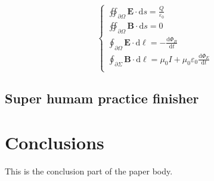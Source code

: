 \begin{equation}
    \left\{ \begin{array}{l}
        \oiint_{\partial \Omega}{\boldsymbol{E}\cdot \mathrm{d}s}=\frac{Q}{\varepsilon _0}\\
        \oiint_{\partial \Omega}{\boldsymbol{B}\cdot \mathrm{d}s}=0\\
        \oint_{\partial \Omega}{\boldsymbol{E}\cdot \mathrm{d}\ell}=-\frac{\mathrm{d}\varPhi _B}{\mathrm{d}t}\\
        \oint_{\partial \Sigma}{\boldsymbol{B}\cdot \mathrm{d}\ell}=\mu _0I+\mu _0\varepsilon _0\frac{\mathrm{d}\varPhi _E}{\mathrm{d}t}\\
    \end{array} \right.
\end{equation}



\subsection{Super humam practice finisher}

\lipsum[1-2]

\section{Conclusions}
\lipsum[1-5]
This is the conclusion part of the paper body. 